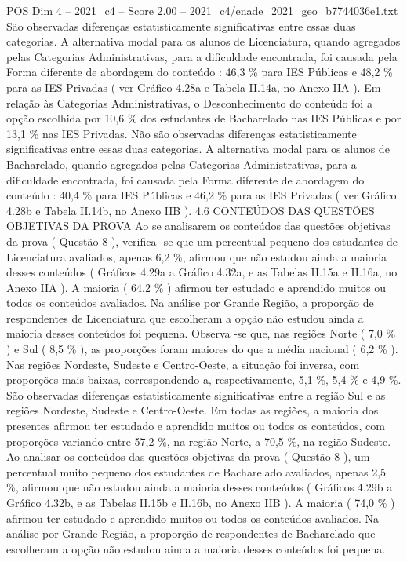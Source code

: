 \begin{textsample}{POS Dim 4 – 2021\_c4 – Score 2.00 – 2021\_c4/enade\_2021\_geo\_b7744036e1.txt}
São observadas diferenças estatisticamente significativas entre essas duas categorias.
A alternativa modal para os alunos de Licenciatura, quando agregados pelas Categorias Administrativas, para a dificuldade encontrada, foi causada pela Forma diferente de abordagem do conteúdo : 46,3 \% para IES Públicas e 48,2 \% para as IES Privadas ( ver Gráfico 4.28a e Tabela II.14a, no Anexo IIA ).
Em relação às Categorias Administrativas, o Desconhecimento do conteúdo foi a opção escolhida por 10,6 \% dos estudantes de Bacharelado nas IES Públicas e por 13,1 \% nas IES Privadas.
Não são observadas diferenças estatisticamente significativas entre essas duas categorias.
A alternativa modal para os alunos de Bacharelado, quando agregados pelas Categorias Administrativas, para a dificuldade encontrada, foi causada pela Forma diferente de abordagem do conteúdo : 40,4 \% para IES Públicas e 46,2 \% para as IES Privadas ( ver Gráfico 4.28b e Tabela II.14b, no Anexo IIB ). 4.6 CONTEÚDOS DAS QUESTÕES OBJETIVAS DA PROVA Ao se analisarem os conteúdos das questões objetivas da prova ( Questão 8 ), verifica -se que um percentual pequeno dos estudantes de Licenciatura avaliados, apenas 6,2 \%, afirmou que não estudou ainda a maioria desses conteúdos ( Gráficos 4.29a a Gráfico 4.32a, e as Tabelas II.15a e II.16a, no Anexo IIA ).
A maioria ( 64,2 \% ) afirmou ter estudado e aprendido muitos ou todos os conteúdos avaliados.
Na análise por Grande Região, a proporção de respondentes de Licenciatura que escolheram a opção não estudou ainda a maioria desses conteúdos foi pequena.
Observa -se que, nas regiões Norte ( 7,0 \% ) e Sul ( 8,5 \% ), as proporções foram maiores do que a média nacional ( 6,2 \% ).
Nas regiões Nordeste, Sudeste e Centro-Oeste, a situação foi inversa, com proporções mais baixas, correspondendo a, respectivamente, 5,1 \%, 5,4 \% e 4,9 \%.
São observadas diferenças estatisticamente significativas entre a região Sul e as regiões Nordeste, Sudeste e Centro-Oeste.
Em todas as regiões, a maioria dos presentes afirmou ter estudado e aprendido muitos ou todos os conteúdos, com proporções variando entre 57,2 \%, na região Norte, a 70,5 \%, na região Sudeste.
Ao analisar os conteúdos das questões objetivas da prova ( Questão 8 ), um percentual muito pequeno dos estudantes de Bacharelado avaliados, apenas 2,5 \%, afirmou que não estudou ainda a maioria desses conteúdos ( Gráficos 4.29b a Gráfico 4.32b, e as Tabelas II.15b e II.16b, no Anexo IIB ).
A maioria ( 74,0 \% ) afirmou ter estudado e aprendido muitos ou todos os conteúdos avaliados.
Na análise por Grande Região, a proporção de respondentes de Bacharelado que escolheram a opção não estudou ainda a maioria desses conteúdos foi pequena.

\end{textsample}
